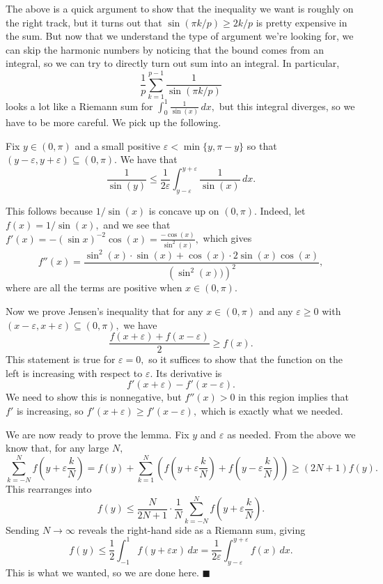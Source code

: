 The above is a quick argument to show that the inequality we want is roughly on the right track, but it turns out that $\sin(\pi k/p)\ge 2k/p$ is pretty expensive in the sum. But now that we understand the type of argument we're looking for, we can skip the harmonic numbers by noticing that the bound comes from an integral, so we can try to directly turn out sum into an integral. In particular,
\[\frac1p\sum_{k=1}^{p-1}\frac1{\sin(\pi k/p)}\]
looks a lot like a Riemann sum for $\int_0^1\frac1{\sin(x)}\,dx,$ but this integral diverges, so we have to be more careful. We pick up the following.
\begin{lemma}
    Fix $y\in(0,\pi)$ and a small positive $\varepsilon<\min\{y,\pi-y\}$ so that $(y-\varepsilon,y+\varepsilon)\subseteq(0,\pi).$ We have that
    \[\frac1{\sin(y)}\le\frac1{2\varepsilon}\int_{y-\varepsilon}^{y+\varepsilon}\frac1{\sin(x)}\,dx.\]
\end{lemma}
This follows because $1/\sin(x)$ is concave up on $(0,\pi).$ Indeed, let $f(x)=1/\sin(x),$ and we see that $f'(x)=-(\sin x)^{-2}\cos(x)=\frac{-\cos(x)}{\sin^2(x)},$ which gives
\[f''(x)=\frac{\sin^2(x)\cdot\sin(x)+\cos(x)\cdot2\sin(x)\cos(x)}{\left(\sin^2(x))\right)^2},\]
where are all the terms are positive when $x\in(0,\pi).$

Now we prove Jensen's inequality that for any $x\in(0,\pi)$ and any $\varepsilon\ge0$ with $(x-\varepsilon,x+\varepsilon)\subseteq(0,\pi),$ we have
\[\frac{f(x+\varepsilon)+f(x-\varepsilon)}2\ge f(x).\]
This statement is true for $\varepsilon=0,$ so it suffices to show that the function on the left is increasing with respect to $\varepsilon.$ Its derivative is
\[f'(x+\varepsilon)-f'(x-\varepsilon).\]
We need to show this is nonnegative, but $f''(x)>0$ in this region implies that $f'$ is increasing, so $f'(x+\varepsilon)\ge f'(x-\varepsilon),$ which is exactly what we needed.

We are now ready to prove the lemma. Fix $y$ and $\varepsilon$ as needed. From the above we know that, for any large $N,$
\[\sum_{k=-N}^Nf\left(y+\varepsilon\frac kN\right)=f(y)+\sum_{k=1}^N\left(f\left(y+\varepsilon\frac kN\right)+f\left(y-\varepsilon\frac kN\right)\right)\ge(2N+1)f(y).\]
This rearranges into
\[f(y)\le\frac N{2N+1}\cdot\frac1N\sum_{k=-N}^Nf\left(y+\varepsilon\frac kN\right).\]
Sending $N\to\infty$ reveals the right-hand side as a Riemann sum, giving
\[f(y)\le\frac12\int_{-1}^1f(y+\varepsilon x)\,dx=\frac1{2\varepsilon}\int_{y-\varepsilon}^{y+\varepsilon}f(x)\,dx.\]
This is what we wanted, so we are done here. $\blacksquare$


